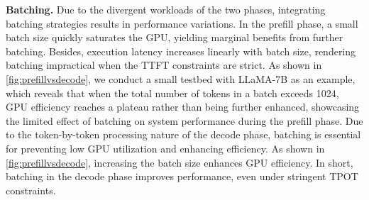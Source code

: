

\noindent \textbf{Batching.}
\label{sec:batching}
Due to the divergent workloads of the two phases, integrating batching strategies results in performance variations. 
% 
In the prefill phase, a small batch size quickly saturates the GPU, yielding marginal benefits from further batching. Besides, execution latency increases linearly with batch size, rendering batching impractical when the TTFT constraints are strict. 
As shown in \autoref{fig:prefillvsdecode}, we conduct a small testbed with LLaMA-7B as an example, which reveals that when the total number of tokens in a batch exceeds 1024, GPU efficiency reaches a plateau rather than being further enhanced, showcasing the limited effect of batching on system performance during the prefill phase. 
% 
Due to the token-by-token processing nature of the decode phase, batching is essential for preventing low GPU utilization and enhancing efficiency. As shown in \autoref{fig:prefillvsdecode}, increasing the batch size enhances GPU efficiency. In short, batching in the decode phase improves performance, even under stringent TPOT constraints.

